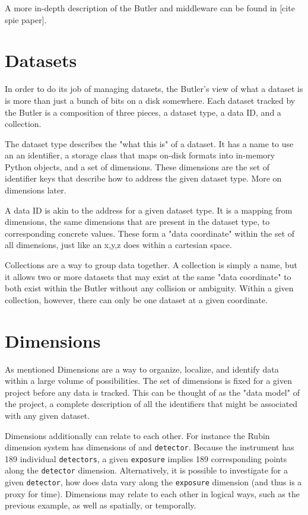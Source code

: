 A more in-depth description of the Butler and middleware can be found in [cite spie paper].

\section{Datasets}
In order to do its job of managing datasets, the Butler's view of what a dataset is is more than just a bunch of bits on a disk somewhere. Each dataset tracked by the Butler is a composition of three pieces, a dataset type, a data ID, and a collection.

The dataset type describes the "what this is" of a dataset. It has a name to use an an identifier, a storage class that maps on-disk formats into in-memory Python objects, and a set of dimensions. These dimensions are the set of identifier keys that describe how to address the given dataset type. More on dimensions later.

A data ID is akin to the address for a given dataset type. It is a mapping from dimensions, the same dimensions that are present in the dataset type, to corresponding concrete values. These form a "data coordinate" within the set of all dimensions, just like an x,y,z does within a cartesian space.

Collections are a way to group data together. A collection is simply a name, but it allows two or more datasets that may exist at the same "data coordinate" to both exist within the Butler without any collision or ambiguity. Within a given collection, however, there can only be one dataset at a given coordinate.

\section{Dimensions}
As mentioned Dimensions are a way to organize, localize, and identify data within a large volume of possibilities. The set of dimensions is fixed for a given project before any data is tracked. This can be thought of as the "data model" of the project, a complete description of all the identifiers that might be associated with any given dataset.

Dimensions additionally can relate to each other. For instance the Rubin dimension system has dimensions of  and \texttt{detector}. Because the instrument has 189 individual \texttt{detectors}, a given \texttt{exposure} implies 189 corresponding points along the \texttt{detector} dimension. Alternatively, it is possible to investigate for a given \texttt{detector}, how does data vary along the \texttt{exposure} dimension (and thus is a proxy for time). Dimensions may relate to each other in logical ways, such as the previous example, as well as spatially, or temporally.

